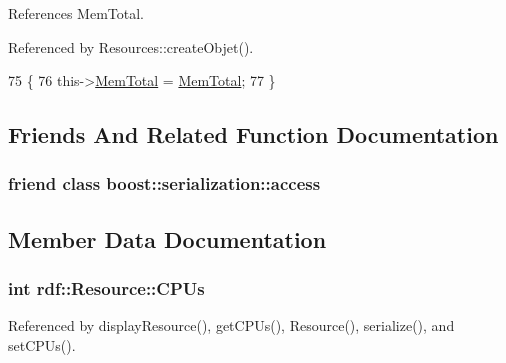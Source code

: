 References Mem\+Total.



Referenced by Resources\+::create\+Objet().


\begin{DoxyCode}
75                                            \{
76                 this->\hyperlink{classrdf_1_1Resource_a37ff1f3b7071c2cdd5dcfa39ed0c7174}{MemTotal} = \hyperlink{classrdf_1_1Resource_a37ff1f3b7071c2cdd5dcfa39ed0c7174}{MemTotal};
77             \}
\end{DoxyCode}


\subsection{Friends And Related Function Documentation}
\subsubsection[{\texorpdfstring{boost\+::serialization\+::access}{boost::serialization::access}}]{\setlength{\rightskip}{0pt plus 5cm}friend class boost\+::serialization\+::access\hspace{0.3cm}{\ttfamily [friend]}}\hypertarget{classrdf_1_1Resource_ac98d07dd8f7b70e16ccb9a01abf56b9c}{}\label{classrdf_1_1Resource_ac98d07dd8f7b70e16ccb9a01abf56b9c}


\subsection{Member Data Documentation}
\subsubsection[{\texorpdfstring{C\+P\+Us}{CPUs}}]{\setlength{\rightskip}{0pt plus 5cm}int rdf\+::\+Resource\+::\+C\+P\+Us\hspace{0.3cm}{\ttfamily [private]}}\hypertarget{classrdf_1_1Resource_aa26913be707d9845b9c3ba180febe043}{}\label{classrdf_1_1Resource_aa26913be707d9845b9c3ba180febe043}


Referenced by display\+Resource(), get\+C\+P\+Us(), Resource(), serialize(), and set\+C\+P\+Us().

